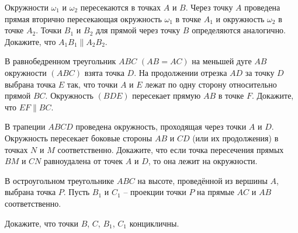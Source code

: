 \begin{tasks}
    \item {}\label{lem:fuss}{Окружности $\omega_1$ и $\omega_2$ пересекаются в точках $A$ и $B$. Через точку $A$ проведена прямая вторично пересекающая окружность $\omega_1$ в точке $A_1$ и окружность $\omega_2$ в точке $A_2$. Точки $B_1$ и $B_2$ для прямой через точку $B$ определяются аналогично. Докажите, что $A_1B_1 \parallel A_2B_2$.}   
    

    \item В равнобедренном треугольник $ABC$ $(AB=AC)$ на меньшей дуге $AB$ окружности $(ABC)$ взята точка $D$. На продолжении отрезка $AD$ за точку $D$ выбрана точка $E$ так, что точки $A$ и $E$ лежат по одну сторону относительно прямой $BC$. Окружность $(BDE)$ пересекает прямую $AB$ в точке $F$. Докажите, что $EF \parallel BC$.

    

    \item В трапеции $ABCD$ проведена окружность, проходящая через точки $A$ и $D$. Окружность пересекает боковые стороны $AB$ и $CD$ (или их продолжения) в точках $N$ и $M$ соответственно. Докажите, что если точка пересечения прямых $BM$ и $CN$ равноудалена от точек $A$ и $D$, то она лежит на окружности. 

    
    \item В остроугольном треугольнике $ABC$ на высоте, проведённой из вершины $A$, выбрана точка $P$. Пусть $B_1$ и $C_1$ -- проекции точки $P$ на прямые $AC$ и $AB$ соответственно. 
    \begin{tasks}
        \item Докажите, что точки $B$, $C$, $B_1$, $C_1$ концикличны. \label{lem:projections}
        

\end{tasks}
\end{tasks}
